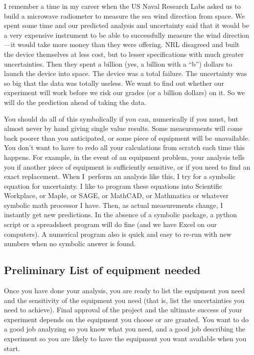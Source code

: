 \documentclass[twoside,11pt,ShortChapTitles]{BYUTextbook}
\begin{document}
I remember a time in my career when the US Naval Research Labs asked us to
build a microwave radiometer to measure the sea wind direction from space.
We spent some time and our predicted analysis and uncertainty said that it
would be a very expensive instrument to be able to successfully measure the
wind direction---it would take more money than they were offering. NRL
disagreed and built the device themselves at less cost, but to lesser
specifications with much greater uncertainties. Then they spent a billion
(yes, a billion with a \textquotedblleft b\textquotedblright ) dollars to
launch the device into space. The device was a total failure. The
uncertainty was so big that the data was totally useless. We want to find
out whether our experiment will work before we risk our grades (or a billion
dollars) on it. So we will do the prediction ahead of taking the data.

You should do all of this symbolically if you can, numerically if you must,
but almost never by hand giving single value results. Some measurements will
come back poorer than you anticipated, or some piece of equipment will be
unavailable. You don't want to have to redo all your calculations from
scratch each time this happens. For example, in the event of an equipment
problem, your analysis tells you if another piece of equipment is
sufficiently sensitive, or if you need to find an exact replacement. When I\
perform an analysis like this, I try for a symbolic equation for
uncertainty. I like to program these equations into Scientific Workplace,
or Maple, or SAGE, or MathCAD, or Mathmatica or whatever symbolic math
processor I have. Then, as actual measurements change, I instantly get new
predictions. In the absence of a symbolic package, a python script or a spreadsheet program
will do fine (and we have Excel on our computers). A numerical program also
is quick and easy to re-run with new numbers when no symbolic answer is
found.

\subsection{Preliminary List of equipment needed}

Once you have done your analysis, you are ready to list the equipment you
need and the sensitivity of the equipment you need (that is, list the
uncertainties you need to achieve). Final approval of the project and the
ultimate success of your experiment depends on the equipment you choose or
are granted. You want to do a good job analyzing so you know what you need,
and a good job describing the experiment so you are likely to have the
equipment you want available when you start.
\end{document}

